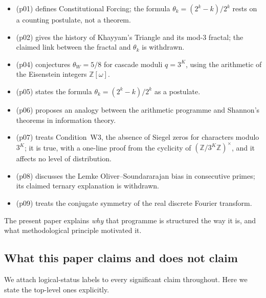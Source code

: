 \documentclass[12pt]{amsart}
\theoremstyle{plain}
\theoremstyle{definition}
\theoremstyle{remark}
\begin{document}
\begin{itemize}
  \item \cite{WakilCF} (p01) defines Constitutional Forcing; the formula
    $\theta_k = (2^k - k)/2^k$ rests on a counting postulate, not a theorem.
  \item \cite{WakilKhayyam} (p02) gives the history of Khayyam's Triangle and
    its mod-$3$ fractal; the claimed link between the fractal and $\theta_k$ is
    withdrawn.
  \item \cite{WakilEisenstein} (p04) conjectures $\theta_W = 5/8$ for cascade
    moduli $q = 3^K$, using the arithmetic of the Eisenstein integers
    $\mathbb{Z}[\omega]$.
  \item \cite{WakilRamanujan} (p05) states the formula
    $\theta_k = (2^k - k)/2^k$ as a postulate.
  \item \cite{WakilShannon} (p06) proposes an analogy between the arithmetic
    programme and Shannon's theorems in information theory.
  \item \cite{WakilW3} (p07) treats Condition~W3, the absence of Siegel zeros
    for characters modulo $3^K$; it is true, with a one-line proof from the
    cyclicity of $(\mathbb{Z}/3^K\mathbb{Z})^\times$, and it affects no level
    of distribution.
  \item \cite{WakilBias} (p08) discusses the Lemke Oliver--Soundararajan bias
    in consecutive primes; its claimed ternary explanation is withdrawn.
  \item \cite{WakilFFT} (p09) treats the conjugate symmetry of the real
    discrete Fourier transform.
\end{itemize}

The present paper explains \emph{why} that programme is structured the way it
is, and what methodological principle motivated it.

\subsection{What this paper claims and does not claim}
\label{sec:claims}

We attach logical-status labels to every significant claim throughout.
Here we state the top-level ones explicitly.
\end{document}

